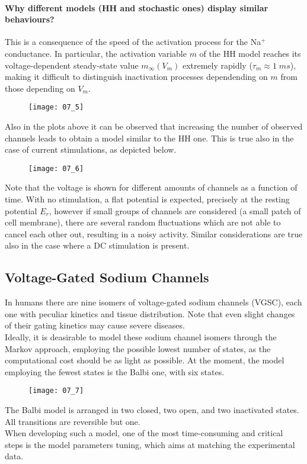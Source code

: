 \paragraph{Why different models (HH and stochastic ones) display similar behaviours?} This is a
consequence of the speed of the activation process for the Na\({}^{+}\) conductance. In particular,
the activation variable \(m\) of the HH model reaches its voltage-dependent steady-state value
\(m_{\infty}(V_{m})\) extremely rapidly (\(\tau_{m}\approx{1\;ms}\)), making it difficult to distinguish
inactivation processes dependending on \(m\) from those depending on \(V_{m}\).
\begin{figure}[H]
    \texttt{[image: 07\_5]}
    \centering
\end{figure}
Also in the plots above it can be observed that increasing the number of observed channels leads to
obtain a model similar to the HH one. This is true also in the case of current stimulations, as depicted below.
\begin{figure}[H]
    \texttt{[image: 07\_6]}
    \centering
\end{figure}
Note that the voltage is shown for different amounts of channels as a function of time. With no stimulation,
a flat potential is expected, precisely at the resting potential \(E_{r}\), however if small groups
of channels are considered (a small patch of cell membrane), there are several random fluctuations which
are not able to cancel each other out, resulting in a noisy activity. Similar considerations are true also
in the case where a DC stimulation is present.

\subsection{Voltage-Gated Sodium Channels}
In humans there are nine isomers of voltage-gated sodium channels (VGSC), each one with peculiar kinetics
and tissue distribution. Note that even slight changes of their gating kinetics may cause severe diseases.\\
Ideally, it is deasirable to model these sodium channel isomers through the Markov approach, employing the
possible lowest number of states, as the computational cost should be as light as possible. At the moment,
the model employing the fewest states is the Balbi one, with six states.
\begin{figure}[H]
    \texttt{[image: 07\_7]}
    \centering
\end{figure}
The Balbi model is arranged in two closed, two open, and two inactivated states. All transitions are
reversible but one.\\
When developing such a model, one of the most time-consuming and critical steps is the model
parameters tuning, which aims at matching the experimental data.